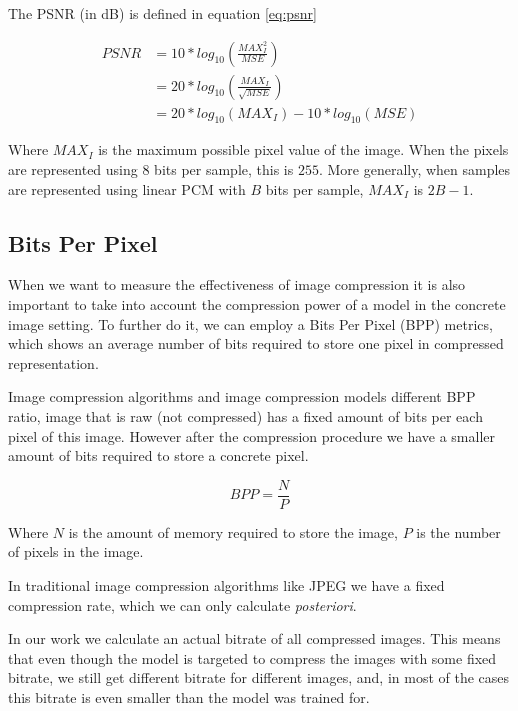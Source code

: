 The PSNR (in dB) is defined in equation \ref{eq:psnr}

\begin{equation}
    \label{eq:psnr}
    \begin{aligned}
        \mathit {PSNR} & = 10 * log_{10} \left(\frac{\mathit{{MAX}_{I}^{2}}}{\mathit {MSE}} \right)   \\
                       & = 20 * log_{10} \left(\frac{\mathit{{MAX}_{I}}}{\sqrt{\mathit{MSE}}} \right) \\
                       & = 20 * log_{10}(\mathit{{MAX}_{I}}) - 10 * log_{10}(\mathit{MSE})
    \end{aligned}
\end{equation}

Where $MAX_I$ is the maximum possible pixel value of the image. When the pixels are represented using $8$ bits per sample, this is $255$. More generally, when samples are represented using linear PCM with $B$ bits per sample, $MAX_I$ is $2B − 1$.

\subsection{Bits Per Pixel}

When we want to measure the effectiveness of image compression it is also important to take into account the compression power of a model in the concrete image setting. To further do it, we can employ a Bits Per Pixel (BPP) metrics, which shows an average number of bits required to store one pixel in compressed representation.

Image compression algorithms and image compression models different BPP ratio, image that is raw (not compressed) has a fixed amount of bits per each pixel of this image. However after  the compression procedure we have a smaller amount of bits required to store a concrete pixel.

\begin{equation}
    \label{eq:bpp}
    \mathit{BPP} = \frac{N}{P}
\end{equation}

Where $N$ is the amount of memory required to store the image, $P$ is the number of pixels in the image.

In traditional image compression algorithms like JPEG we have a fixed compression rate, which we can only calculate \textit{posteriori}.

In our work we calculate an actual bitrate of all compressed images. This means that even though the model is targeted to compress the images with some fixed bitrate, we still get different bitrate for different images, and, in most of the cases this bitrate is even smaller than the model was trained for.

